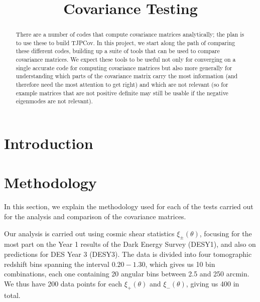 \documentclass[twocolumn]{\docclass}
\begin{document}
	
	\title{Covariance Testing}
	
	\maketitlepre
	
	\begin{abstract}
		
		There  are a number of codes that compute covariance matrices analytically; the plan is to use these to build TJPCov. In this project, we start along the path of comparing these different codes, building up a suite of tools that can be used to compare covariance matrices. We expect these tools to be useful not only for converging on a single accurate code for computing covariance matrices but also more generally for understanding which parts of the covariance matrix carry the most information (and therefore need the most attention to get right) and which are not relevant (so for example matrices that are not positive definite may still be usable if the negative eigenmodes are not relevant).
	\end{abstract}
	
	\dockeys{}
	
	\maketitlepost
	
	
	\section{Introduction}
	\label{sec:intro}
	
	
	
	\section{Methodology}
	\label{sec:methods}
	
	In this section, we explain the methodology used for each of the tests carried out for the analysis and comparison of the covariance matrices. 
	
	Our analysis is carried out using cosmic shear statistics $\xi_\pm(\theta)$, focusing for the most part on the Year 1 results of the Dark Energy Survey \citep{Abbott:2018cms} (DESY1), and also on predictions for DES Year 3 (DESY3). The data is divided into four tomographic redshift bins spanning the interval $0.20 - 1.30$, which gives us 10 bin combinations, each one containing 20 angular bins between 2.5 and 250 arcmin. We thus have 200 data points for each $\xi_+(\theta)$ and $\xi_-(\theta)$, giving us 400 in total. 
	
\end{document}
